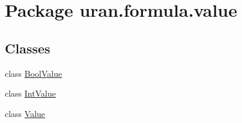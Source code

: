 \hypertarget{namespaceuran_1_1formula_1_1value}{}\section{Package uran.\+formula.\+value}
\label{namespaceuran_1_1formula_1_1value}
\subsection*{Classes}
\begin{DoxyCompactItemize}
\item 
class \hyperlink{classuran_1_1formula_1_1value_1_1_bool_value}{Bool\+Value}
\item 
class \hyperlink{classuran_1_1formula_1_1value_1_1_int_value}{Int\+Value}
\item 
class \hyperlink{classuran_1_1formula_1_1value_1_1_value}{Value}
\end{DoxyCompactItemize}
